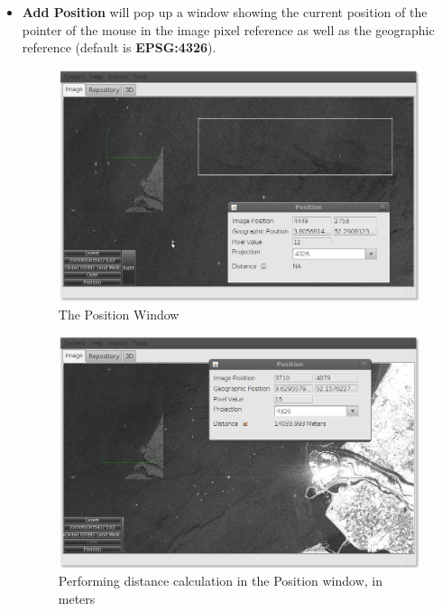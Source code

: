 \documentclass[12pt,a4paper,final]{report}
\begin{document}
\begin{itemize}
 \item \textbf{Add Position} will pop up a window showing the current position of the pointer of the mouse in the image pixel reference as well as the geographic reference (default is \textbf{EPSG:4326}).
\begin{figure}[H]
 \centering
 \includegraphics[scale=0.45,keepaspectratio=true]{./images/PositionLayer.png}
 \caption{The Position Window}
\end{figure}

\begin{figure}[H]
 \centering
 \includegraphics[scale=0.45,keepaspectratio=true]{./images/DistanceCalculation.png}
 \caption{Performing distance calculation in the Position window, in meters}
\end{figure}
 
\end{itemize}
\end{document}
